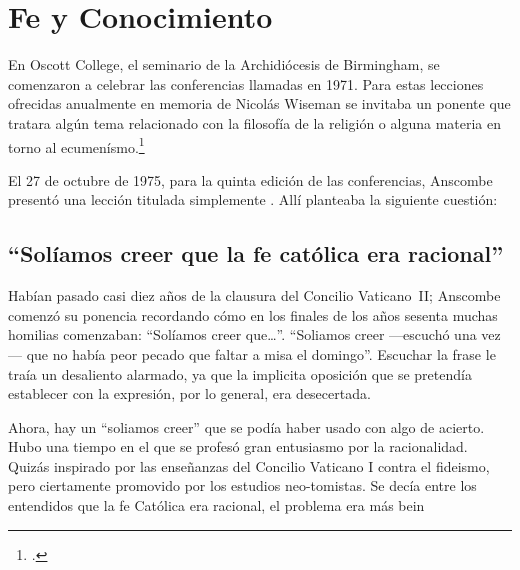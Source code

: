 \section{Fe y Conocimiento}

En Oscott College, el seminario de la Archidiócesis de Birmingham, se
comenzaron a celebrar las conferencias llamadas 
en 1971. Para estas lecciones ofrecidas anualmente en memoria de Nicolás
Wiseman se invitaba un ponente que tratara algún tema relacionado con la
filosofía de la religión o alguna materia en torno al
ecumenísmo.\footcite[cf.~][p.~7]{wisemanlects}

El 27 de octubre de 1975, para la quinta edición de las conferencias, Anscombe
presentó una lección titulada simplemente . Allí planteaba la
siguiente cuestión: 



\subsection{``Solíamos creer que la fe católica era racional''} Habían pasado
casi diez años de la clausura del Concilio \mbox{Vaticano II}; Anscombe comenzó
su ponencia recordando cómo en los finales de los años sesenta muchas homilias
comenzaban: ``Solíamos creer que\ldots''. ``Soliamos creer ---escuchó una vez---
que no había peor pecado que faltar a misa el domingo''. Escuchar la frase le
traía un desaliento alarmado, ya que la implicita oposición que se pretendía
establecer con la expresión, por lo general, era desecertada.

Ahora, hay un ``soliamos creer'' que se podía haber usado con algo de acierto.
Hubo una tiempo en el que se profesó gran entusiasmo por la racionalidad. Quizás
inspirado por las enseñanzas del Concilio Vaticano I contra el fideismo, pero
ciertamente promovido por los estudios neo-tomistas. Se decía entre los
entendidos que la fe Católica era racional, el problema era más bein

